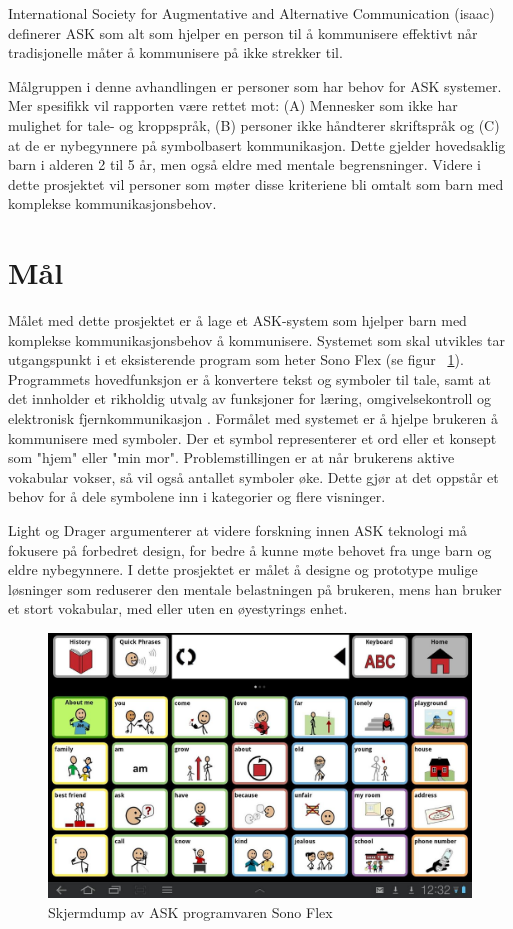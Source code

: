 \documentclass[phd,tocprelim]{cornell}
\begin{document}
International Society for Augmentative and Alternative Communication (\gls{isaac}) \cite{HvaErASK} definerer ASK som alt som hjelper en person til å kommunisere effektivt når tradisjonelle måter å kommunisere på ikke strekker til.

Målgruppen i denne avhandlingen er personer som har behov for ASK systemer. Mer spesifikk vil rapporten være rettet mot: (A) Mennesker som ikke har mulighet for tale- og kroppspråk,  (B) personer ikke håndterer skriftspråk og (C) at de er nybegynnere på symbolbasert kommunikasjon. Dette gjelder hovedsaklig barn i alderen 2 til 5 år, men også eldre med mentale begrensninger. Videre i dette prosjektet vil personer som møter disse kriteriene bli omtalt som barn med komplekse kommunikasjonsbehov. 

\section{Mål}
\label{sec:goal}

Målet med dette prosjektet er å lage et ASK-system som hjelper barn med komplekse kommunikasjonsbehov å kommunisere. Systemet som skal utvikles tar utgangspunkt i et eksisterende program som heter Sono Flex (se figur ~\ref{fig:SonoFlex}). Programmets hovedfunksjon er å konvertere tekst og symboler til tale, samt at det innholder et rikholdig utvalg av funksjoner for læring, omgivelsekontroll og elektronisk fjernkommunikasjon \cite{TobiiCommunicator}. Formålet med systemet er å hjelpe brukeren å kommunisere med symboler. Der et symbol representerer et ord eller et konsept som "hjem" eller "min mor". Problemstillingen er at når brukerens aktive vokabular vokser, så vil også antallet symboler øke. Dette gjør at det oppstår et behov for å dele symbolene inn i kategorier og flere visninger.

Light og Drager \cite{aac} argumenterer at videre forskning innen ASK teknologi må fokusere på forbedret design, for bedre å kunne møte behovet fra unge barn og eldre nybegynnere. I dette prosjektet er målet å designe og prototype mulige løsninger som reduserer den mentale belastningen på brukeren, mens han bruker et stort vokabular, med eller uten en øyestyrings enhet.

\begin{figure}[ht!]
\centering
\includegraphics[width=150mm]{SonoFlex2}
\caption{Skjermdump av ASK programvaren Sono Flex}
\label{fig:SonoFlex}
\end{figure}
\end{document}
